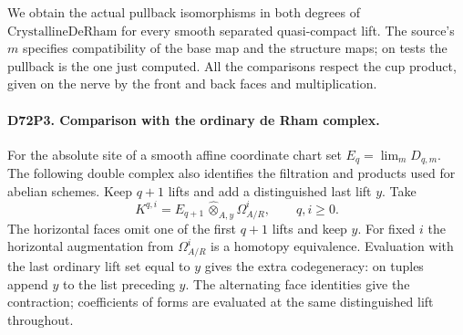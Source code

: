 We obtain the actual pullback isomorphisms in both degrees of
$\mathrm{CrystallineDeRham}$ for every smooth separated
quasi-compact lift. The source's $m$ specifies compatibility of
the base map and the structure maps; on tests the pullback is the
one just computed. All the comparisons respect the cup product,
given on the nerve by the front and back faces and multiplication.

\paragraph{D72P3. Comparison with the ordinary de Rham complex.}
For the absolute site of a smooth affine coordinate chart set
$E_q=\lim_m D_{q,m}$. The following double complex also identifies
the filtration and products used for abelian schemes. Keep $q+1$
lifts and add a distinguished last lift $y$. Take
\[
 K^{q,i}=E_{q+1}\,\widehat\otimes_{A,y}\Omega^i_{A/R},
 \qquad q,i\ge0 .
\]
The horizontal faces omit one of the first $q+1$ lifts and keep $y$.
For fixed $i$ the horizontal augmentation from $\Omega^i_{A/R}$
is a homotopy equivalence. Evaluation with the last ordinary lift
set equal to $y$ gives the extra codegeneracy: on tuples append
$y$ to the list preceding $y$. The alternating face identities give
the contraction; coefficients of forms are evaluated at the same
distinguished lift throughout.

